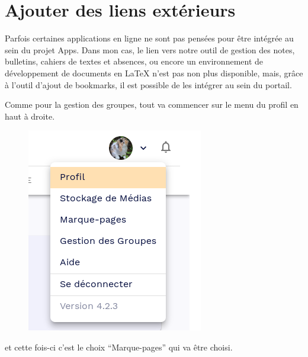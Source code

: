 \section{Ajouter des liens extérieurs}
Parfois certaines applications en ligne ne sont pas pensées pour être intégrée au sein du projet Apps. 
Dans mon cas, le lien vers notre outil de gestion des notes, bulletins, cahiers de textes et absences, ou encore un environnement de développement de documents en \LaTeX{} n'est pas non plus disponible, mais, grâce à l'outil d'ajout de bookmarks, il est possible de les intégrer au sein du portail.

Comme pour la gestion des groupes, tout va commencer sur le menu du profil en haut à droite.
\begin{figure}
	\centering
	\includegraphics[width=0.3333\linewidth]{./Captures/menu.profil.png}
\end{figure}
et cette fois-ci c'est le choix ``Marque-pages'' qui va être choisi. 

